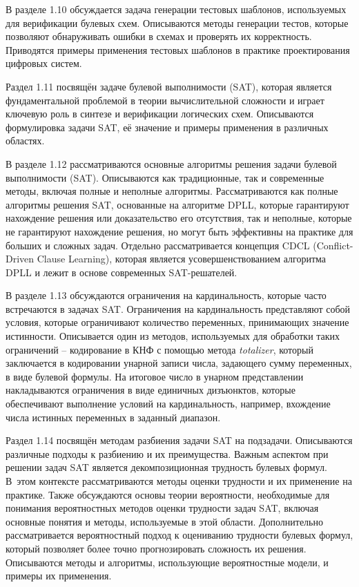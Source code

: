 В разделе 1.10 обсуждается задача генерации тестовых шаблонов, используемых для верификации булевых схем. Описываются методы генерации тестов, которые позволяют обнаруживать ошибки в схемах и проверять их корректность. Приводятся примеры применения тестовых шаблонов в практике проектирования цифровых систем.

Раздел 1.11 посвящён задаче булевой выполнимости (SAT), которая является фундаментальной проблемой в теории вычислительной сложности и играет ключевую роль в синтезе и верификации логических схем. Описываются формулировка задачи SAT, её значение и примеры применения в различных областях.

В разделе 1.12 рассматриваются основные алгоритмы решения задачи булевой выполнимости (SAT).
Описываются как традиционные, так и современные методы, включая полные и неполные алгоритмы.
Рассматриваются как полные алгоритмы решения SAT, основанные на алгоритме DPLL, которые гарантируют нахождение решения или доказательство его отсутствия, так и неполные, которые не гарантируют нахождение решения, но могут быть эффективны на практике для больших и сложных задач.
Отдельно рассматривается концепция CDCL (Conflict-Driven Clause Learning), которая является усовершенствованием алгоритма DPLL и лежит в основе современных SAT-решателей.

В разделе 1.13 обсуждаются ограничения на кардинальность, которые часто встречаются в задачах SAT.
Ограничения на кардинальность представляют собой условия, которые ограничивают количество переменных, принимающих значение истинности.
Описывается один из методов, используемых для обработки таких ограничений \--- кодирование в КНФ с помощью метода \textit{totalizer}, который заключается в кодировании унарной записи числа, задающего сумму переменных, в виде булевой формулы.
На итоговое число в унарном представлении накладываются ограничения в виде единичных дизъюнктов, которые обеспечивают выполнение условий на кардинальность, например, вхождение числа истинных переменных в заданный диапазон.

Раздел 1.14 посвящён методам разбиения задачи SAT на подзадачи.
Описываются различные подходы к разбиению и их преимущества.
Важным аспектом при решении задач SAT является декомпозиционная трудность булевых формул.
В~этом контексте рассматриваются методы оценки трудности и их применение на практике.
Также обсуждаются основы теории вероятности, необходимые для понимания вероятностных методов оценки трудности задач SAT, включая основные понятия и методы, используемые в этой области.
Дополнительно рассматривается вероятностный подход к оцениванию трудности булевых формул, который позволяет более точно прогнозировать сложность их решения.
Описываются методы и алгоритмы, использующие вероятностные модели, и примеры их применения.




